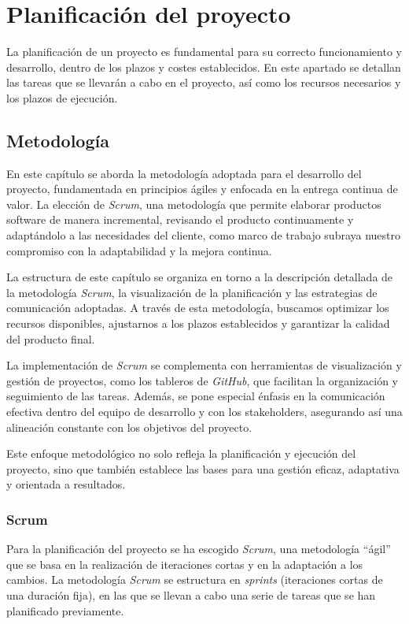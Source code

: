 \chapter{Planificación del proyecto}\label{chap:planif}
La planificación de un proyecto es fundamental para su correcto funcionamiento y desarrollo,
dentro de los plazos y costes establecidos. En este apartado se detallan las tareas que se
llevarán a cabo en el proyecto, así como los recursos necesarios y los plazos de ejecución.

\section{Metodología}\label{sec:metodología}
En este capítulo se aborda la metodología adoptada para el desarrollo del proyecto, fundamentada
en principios ágiles y enfocada en la entrega continua de valor. La elección de \textit{Scrum},
una metodología que permite elaborar productos software de manera incremental, revisando el
producto continuamente y adaptándolo a las necesidades del cliente, como marco de trabajo subraya
nuestro compromiso con la adaptabilidad y la mejora continua.

La estructura de este capítulo se organiza en torno a la descripción detallada de la metodología
\textit{Scrum}, la visualización de la planificación y las estrategias de comunicación adoptadas.
A través de esta metodología, buscamos optimizar los recursos disponibles, ajustarnos a los plazos
establecidos y garantizar la calidad del producto final.

La implementación de \textit{Scrum} se complementa con herramientas de visualización y gestión de
proyectos, como los tableros de \textit{GitHub}, que facilitan la organización y seguimiento de
las tareas. Además, se pone especial énfasis en la comunicación efectiva dentro del equipo de
desarrollo y con los stakeholders, asegurando así una alineación constante con los objetivos del
proyecto.

Este enfoque metodológico no solo refleja la planificación y ejecución del proyecto, sino que
también establece las bases para una gestión eficaz, adaptativa y orientada a resultados.

\subsection{Scrum}\label{subsec:scrum}
Para la planificación del proyecto se ha escogido \textit{Scrum}, una metodología ``ágil'' que se
basa en la realización de iteraciones cortas y en la adaptación a los cambios. La metodología
\textit{Scrum} se estructura en \textit{sprints} (iteraciones cortas de una duración fija),
en las que se llevan a cabo una serie de tareas que se han planificado previamente.

